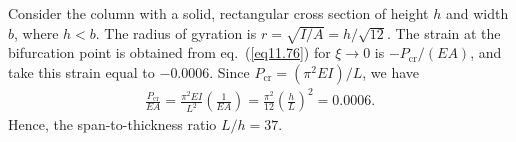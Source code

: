 \documentclass{AeroStructure-ERJohnson}
\begin{document}
\begin{example}\label{ex11.2}%
Consider the column with a solid, rectangular cross section of height $h$ and width $b$, where $h<b$. The radius of gyration is $r=\sqrt{I/A}=h/\sqrt{12}$. The strain at the bifurcation point is obtained from eq.~(\ref{eq11.76}) for $\xi \rightarrow 0$ is $-P_{\mathrm{cr}} /(E A)$, and take this strain equal to $-0.0006$. Since $P_{\mathrm{cr}}=\left(\pi^{2} E I\right)/ L$, we have
\begin{align}
\frac{P_{\mathrm{cr}}}{E A}=\frac{\pi^{2} E I}{L^{2}}\left(\frac{1}{E A}\right)=\frac{\pi^{2}}{12}\left(\frac{h}{L}\right)^{2}=0.0006. \label{eq11.2.a}\tag{a}
\end{align}
Hence, the span-to-thickness ratio $L/h=37$.


\end{example}
\end{document}
